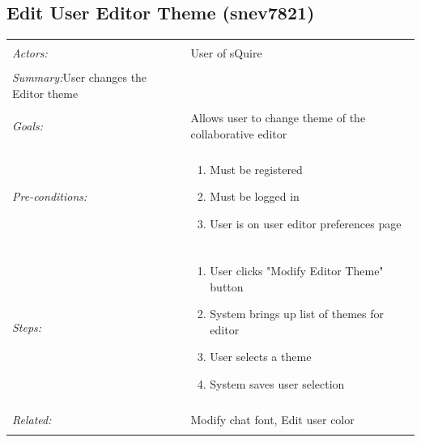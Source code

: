 \documentclass[11pt]{report}
\begin{document}
\subsection{Edit User Editor Theme (snev7821)}
\begin{tabular}{ p{2cm} p{12cm} }
\hline
	\\
	\textit{Actors:} & User of sQuire \\
	\\
	\textit{Summary:}User changes the Editor theme \\
	\\
	\textit{Goals:} & Allows user to change theme of the collaborative editor \\
	\\
	\textit{Pre-conditions:} & \begin{enumerate}
		\item Must be registered
		\item Must be logged in
		\item User is on user editor preferences page
	\end{enumerate} \\
	\\
	\textit{Steps:} & \begin{enumerate}
		\item User clicks "Modify Editor Theme" button
		\item System brings up list of themes for editor
		\item User selects a theme
		\item System saves user selection
	\end{enumerate} \\
	\\
	\textit{Related:} & Modify chat font, Edit user color \\
	\\
\hline
\end{tabular}
\newpage
\end{document}

